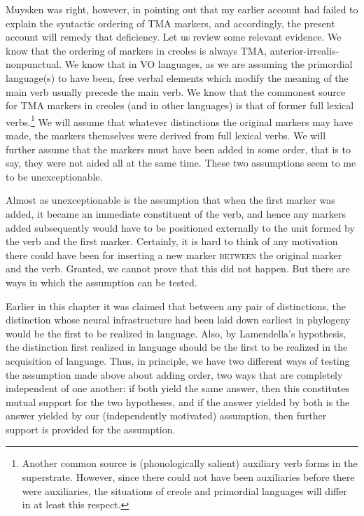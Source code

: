 Muysken was right, however, in pointing out that my earlier account had failed to explain the syntactic ordering of TMA markers, and accordingly, the present account will remedy that deficiency. Let us review some relevant evidence. We know that the ordering of markers in creoles is always TMA, anterior-irrealis-nonpunctual. We know that in VO languages, as we are assuming the primordial language(s) to have been, free verbal elements which modify the meaning of the main verb usually precede the main verb. We know that the commonest source for TMA markers in creoles (and in other languages) is that of former full lexical verbs.\footnote{Another common source is (phonologically salient) auxiliary verb forms in the superstrate. However, since there could not have been auxiliaries before there were auxiliaries, the situations of creole and primordial languages will differ in at least this respect.} We will assume that whatever distinctions the original markers may have made, the markers themselves were derived from full lexical verbs. We will further assume that the markers must have been added in some order, that is to say, they were not aided all at the same time. These two assumptions seem to me to be unexceptionable.

Almost as unexceptionable is the assumption that when the first marker was added, it became an immediate constituent of the verb, and hence any markers added subsequently would have to be positioned externally to the unit formed by the verb and the first marker. Certainly, it is hard to think of any motivation there could have been for inserting a new marker \textsc{between} the original marker and the verb. Granted, we cannot prove that this did not happen. But there are ways in which the assumption can be tested.

Earlier in this chapter it was claimed that between any pair of distinctions, the distinction whose neural infrastructure had been laid down earliest in phylogeny would be the first to be realized in language.
Also, by Lamendella's hypothesis, the distinction first realized in language should be the first to be realized in the acquisition of language. Thus, in principle, we have two different ways of testing the assumption made above about adding order, two ways that are completely independent of one another: if both yield the same answer, then this constitutes mutual support for the two hypotheses, and if the answer yielded by both is the answer yielded by our (independently motivated) assumption, then further support is provided for the assumption.

